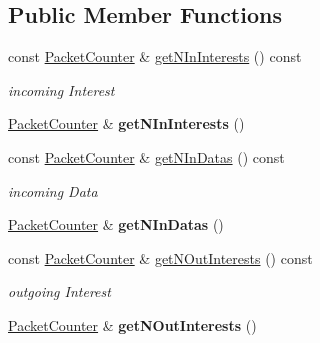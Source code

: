 \subsection*{Public Member Functions}
\begin{DoxyCompactItemize}
\item 
const \hyperlink{classnfd_1_1PacketCounter}{Packet\+Counter} \& \hyperlink{classnfd_1_1NetworkLayerCounters_a87d4f1174d8954036b214985816b0a7e}{get\+N\+In\+Interests} () const\hypertarget{classnfd_1_1NetworkLayerCounters_a87d4f1174d8954036b214985816b0a7e}{}\label{classnfd_1_1NetworkLayerCounters_a87d4f1174d8954036b214985816b0a7e}

\begin{DoxyCompactList}\small\item\em incoming Interest \end{DoxyCompactList}\item 
\hyperlink{classnfd_1_1PacketCounter}{Packet\+Counter} \& {\bfseries get\+N\+In\+Interests} ()\hypertarget{classnfd_1_1NetworkLayerCounters_afe8775963526fc4cade7a580672cc3e3}{}\label{classnfd_1_1NetworkLayerCounters_afe8775963526fc4cade7a580672cc3e3}

\item 
const \hyperlink{classnfd_1_1PacketCounter}{Packet\+Counter} \& \hyperlink{classnfd_1_1NetworkLayerCounters_a7cad5e69cbf8f8363e3ff429f95ab3a8}{get\+N\+In\+Datas} () const\hypertarget{classnfd_1_1NetworkLayerCounters_a7cad5e69cbf8f8363e3ff429f95ab3a8}{}\label{classnfd_1_1NetworkLayerCounters_a7cad5e69cbf8f8363e3ff429f95ab3a8}

\begin{DoxyCompactList}\small\item\em incoming Data \end{DoxyCompactList}\item 
\hyperlink{classnfd_1_1PacketCounter}{Packet\+Counter} \& {\bfseries get\+N\+In\+Datas} ()\hypertarget{classnfd_1_1NetworkLayerCounters_a824433cbbe3310f3614f5fb99a0de97b}{}\label{classnfd_1_1NetworkLayerCounters_a824433cbbe3310f3614f5fb99a0de97b}

\item 
const \hyperlink{classnfd_1_1PacketCounter}{Packet\+Counter} \& \hyperlink{classnfd_1_1NetworkLayerCounters_a0dc171d6c8ef7b3cf2fcaf64793a51ca}{get\+N\+Out\+Interests} () const\hypertarget{classnfd_1_1NetworkLayerCounters_a0dc171d6c8ef7b3cf2fcaf64793a51ca}{}\label{classnfd_1_1NetworkLayerCounters_a0dc171d6c8ef7b3cf2fcaf64793a51ca}

\begin{DoxyCompactList}\small\item\em outgoing Interest \end{DoxyCompactList}\item 
\hyperlink{classnfd_1_1PacketCounter}{Packet\+Counter} \& {\bfseries get\+N\+Out\+Interests} ()\hypertarget{classnfd_1_1NetworkLayerCounters_a4e7d2395fd583675d732bd0c2b8439c2}{}\label{classnfd_1_1NetworkLayerCounters_a4e7d2395fd583675d732bd0c2b8439c2}


\end{DoxyCompactItemize}

